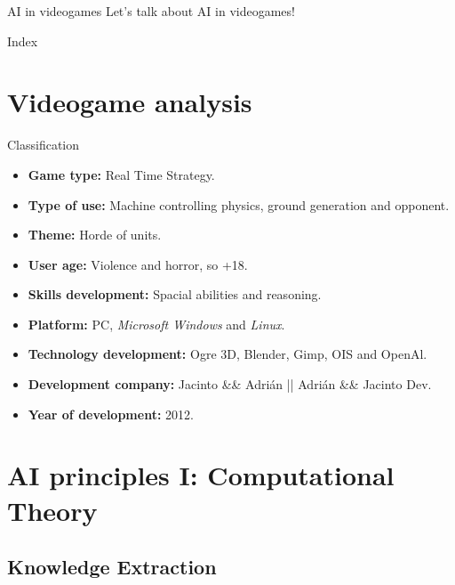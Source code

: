 \documentclass[10pt]{beamer}
\begin{document}
	\begin{frame}{AI in videogames}
		\Large Let's talk about AI in videogames!
	\end{frame}

	\begin{frame}{Index}
		\tableofcontents
	\end{frame}

	\section{Videogame analysis}

  
	\begin{frame}{Classification}
	  \footnotesize
	  \begin{itemize}
	  \item \textbf{Game type:} Real Time Strategy.
	  \item \textbf{Type of use:} Machine controlling physics, ground generation and opponent.
	  \item \textbf{Theme:} Horde of units.
	  \item \textbf{User age:} Violence and horror, so +18.
	  \item \textbf{Skills development:} Spacial abilities and reasoning.
	  \item \textbf{Platform:} PC, \textit{Microsoft Windows} and \textit{Linux}.
	  \item \textbf{Technology development:} Ogre 3D, Blender, Gimp, OIS and OpenAl.
	  \item \textbf{Development company:} Jacinto \&\& Adrián || Adrián \&\& Jacinto Dev.
	  \item \textbf{Year of development:} 2012.
	  \end{itemize}
	\end{frame}

	\section{AI principles I: Computational Theory}

	  \subsection{Knowledge Extraction}
\end{document}
